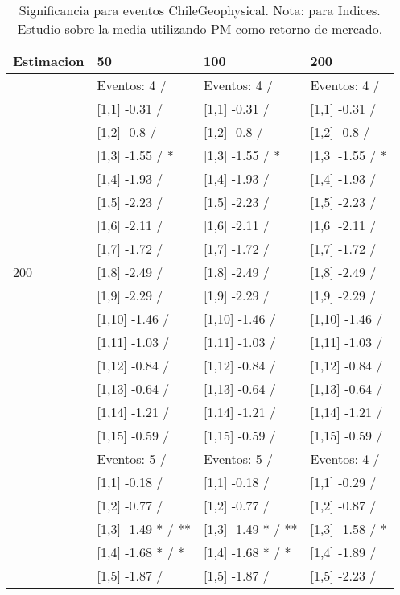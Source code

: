\begin{table}

\caption{Significancia para eventos ChileGeophysical. Nota: para Indices. Estudio sobre la media utilizando PM como retorno de mercado.}
\centering
\begin{tabular}[t]{llll}
\toprule
Estimacion & 50 & 100 & 200\\
\midrule
 & Eventos:  4 / & Eventos:  4 / & Eventos:  4 /\\
 & {}[1,1] -0.31  / & {}[1,1] -0.31  / & {}[1,1] -0.31  /\\
 & {}[1,2] -0.8  / & {}[1,2] -0.8  / & {}[1,2] -0.8  /\\
 & {}[1,3] -1.55  / * & {}[1,3] -1.55  / * & {}[1,3] -1.55  / *\\
 & {}[1,4] -1.93  / & {}[1,4] -1.93  / & {}[1,4] -1.93  /\\
\addlinespace
 & {}[1,5] -2.23  / & {}[1,5] -2.23  / & {}[1,5] -2.23  /\\
 & {}[1,6] -2.11  / & {}[1,6] -2.11  / & {}[1,6] -2.11  /\\
 & {}[1,7] -1.72  / & {}[1,7] -1.72  / & {}[1,7] -1.72  /\\
200 & {}[1,8] -2.49  / & {}[1,8] -2.49  / & {}[1,8] -2.49  /\\
 & {}[1,9] -2.29  / & {}[1,9] -2.29  / & {}[1,9] -2.29  /\\
\addlinespace
 & {}[1,10] -1.46  / & {}[1,10] -1.46  / & {}[1,10] -1.46  /\\
 & {}[1,11] -1.03  / & {}[1,11] -1.03  / & {}[1,11] -1.03  /\\
 & {}[1,12] -0.84  / & {}[1,12] -0.84  / & {}[1,12] -0.84  /\\
 & {}[1,13] -0.64  / & {}[1,13] -0.64  / & {}[1,13] -0.64  /\\
 & {}[1,14] -1.21  / & {}[1,14] -1.21  / & {}[1,14] -1.21  /\\
\addlinespace
 & {}[1,15] -0.59  / & {}[1,15] -0.59  / & {}[1,15] -0.59  /\\
 & Eventos:  5 / & Eventos:  5 / & Eventos:  4 /\\
 & {}[1,1] -0.18  / & {}[1,1] -0.18  / & {}[1,1] -0.29  /\\
 & {}[1,2] -0.77  / & {}[1,2] -0.77  / & {}[1,2] -0.87  /\\
 & {}[1,3] -1.49 * / ** & {}[1,3] -1.49 * / ** & {}[1,3] -1.58  / *\\
\addlinespace
 & {}[1,4] -1.68 * / * & {}[1,4] -1.68 * / * & {}[1,4] -1.89  /\\
 & {}[1,5] -1.87  / & {}[1,5] -1.87  / & {}[1,5] -2.23  /\\

\end{tabular}
\end{table}
